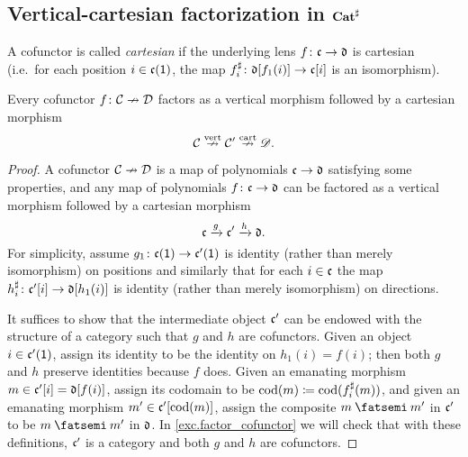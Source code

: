 \documentclass[Book-Poly]{subfiles}
\begin{document}
\subsection{Vertical-cartesian factorization in $\mathbf{Cat}^\sharp$}

A cofunctor is called \emph{cartesian} if the underlying lens $f\colon\mathfrak{c}\to\mathfrak{d}$ is cartesian (i.e.\ for each position $i\in\mathfrak{c}(\textsf{1})$, the map $f^\sharp_i\colon\mathfrak{d}[f_1(i)]\to\mathfrak{c}[i]$ is an isomorphism). %

\begin{proposition}\label{prop.factor_cofunctor}
Every cofunctor $f\colon\mathcal{C}\nrightarrow\mathcal{D}$ factors as a vertical morphism followed by a cartesian morphism
\[
\mathcal{C}\overset{\text{vert}}{\nrightarrow}\mathcal{C}'\overset{\text{cart}}{\nrightarrow}\mathscr{D}.
\]
\end{proposition}
\begin{proof}
A cofunctor $\mathcal{C}\nrightarrow\mathcal{D}$ is a map of polynomials $\mathfrak{c}\to\mathfrak{d}$ satisfying some properties, and any map of polynomials $f\colon\mathfrak{c}\to\mathfrak{d}$ can be factored as a vertical morphism followed by a cartesian morphism
\[
	\mathfrak{c}\xrightarrow{g}\mathfrak{c'}\xrightarrow{h}\mathfrak{d}.
\]
For simplicity, assume $g_1\colon\mathfrak{c}(\textsf{1})\to\mathfrak{c'}(\textsf{1})$ is identity (rather than merely isomorphism) on positions and similarly that for each $i\in\mathfrak{c}$ the map $h^\sharp_i\colon\mathfrak{c'}[i]\to\mathfrak{d}[h_1(i)]$ is identity (rather than merely isomorphism) on directions. 

It suffices to show that the intermediate object $\mathfrak{c'}$ can be endowed with the structure of a category such that $g$ and $h$ are cofunctors. Given an object $i\in\mathfrak{c'}(\textsf{1})$, assign its identity to be the identity on $h_1(i)=f(i)$; then both $g$ and $h$ preserve identities because $f$ does. Given an emanating morphism $m\in\mathfrak{c'}[i]=\mathfrak{d}[f(i)]$, assign its codomain to be $\operatorname{cod}(m)\coloneqq\operatorname{cod}(f^\sharp_i(m))$, and given an emanating morphism $m'\in\mathfrak{c'}[\operatorname{cod}(m)]$, assign the composite $m\then m'$ in $\mathfrak{c'}$ to be $m\then m'$ in $\mathfrak{d}$. In \cref{exc.factor_cofunctor} we will check that with these definitions, $\mathfrak{c'}$ is a category and both $g$ and $h$ are cofunctors.
\end{proof}
\end{document}
